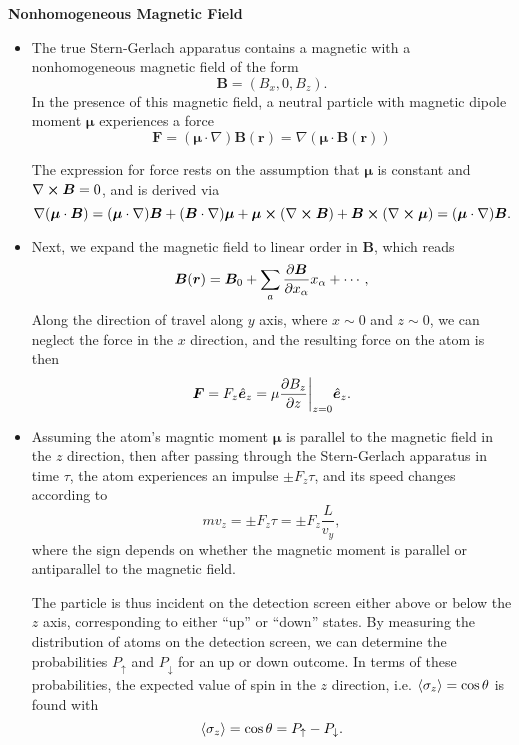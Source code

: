 \documentclass[11pt, a4paper]{article}
\renewcommand{\curl}{\nabla \cross}
\renewcommand{\grad}{\nabla}
\newcommand{\SG}{Stern-Gerlach\xspace}
\renewcommand{\vec}[1]{\bm{#1}}  %
\newcommand{\uvec}[1]{\hat{\vec{#1}}}  %
\newcommand{\ua}{\uparrow}  %
\newcommand{\da}{\downarrow}  %
\renewcommand{\r}{\vec{r}}  %
\newcommand{\B}{\vec{B}}  %
\newcommand{\m}{\vec{\mu}}  %
\begin{document}
\textbf{Nonhomogeneous Magnetic Field}
\begin{itemize}
    \item The true \SG apparatus contains a magnetic with a nonhomogeneous magnetic field of the form
    \begin{equation*}
        \B = (B_{x}, 0, B_{z}).
    \end{equation*}
    In the presence of this magnetic field, a neutral particle with magnetic dipole moment $ \m $ experiences a force
    \begin{equation*}
        \vec{F} = (\vec{\mu} \cdot \grad)\B(\r) = \grad (\m \cdot \B(\r))
    \end{equation*}
   

    The expression for force rests on the assumption that $ \m $ is constant and $ \curl \B = 0 $, and is derived via
    \begin{equation*}
        \grad (\m \cdot \B) = (\m \cdot \grad)\B + (\B \cdot \grad)\m + \m \cross (\curl \B) + \B \cross (\curl \m) = (\m \cdot \grad)\B.
    \end{equation*}
    
    \item Next, we expand the magnetic field to linear order in $ \B $, which reads
    \begin{equation*}
        \B(\r) = \B_{0} + \sum_{a} \pdv{\B}{x_{\alpha}}x_{\alpha} + \cdots,
    \end{equation*}
    Along the direction of travel along $ y $ axis, where $ x \sim 0 $ and $ z \sim 0 $, we can neglect the force in the $ x $ direction, and the resulting force on the atom is then
    \begin{equation*}
        \vec{F} = F_{z}\uvec{e}_{z} = \mu \pdv{B_{z}}{z}\bigg |_{z=0} \uvec{e}_{z}.
    \end{equation*}
    
    \item Assuming the atom's magntic moment $ \m $ is parallel to the magnetic field in the $ z $ direction, then after passing through the \SG apparatus in time $ \tau $, the atom experiences an impulse $ \pm F_{z} \tau $, and its speed changes according to
    \begin{equation*}
        m v_{z} = \pm F_{z} \tau = \pm F_{z} \frac{L}{v_{y}},
    \end{equation*}
    where the sign depends on whether the magnetic moment is parallel or antiparallel to the magnetic field.

    The particle is thus incident on the detection screen either above or below the $ z $ axis, corresponding to either ``up'' or ``down'' states. By measuring the distribution of atoms on the detection screen, we can determine the probabilities $ P_{\ua} $ and $ P_{\da} $ for an up or down outcome. In terms of these probabilities, the expected value of spin in the $ z $ direction, i.e. $ \ev{\sigma_{z}} = \cos \theta $ is found with
    \begin{equation*}
        \ev{\sigma_{z}} = \cos \theta = P_{\ua} - P_{\da}.
    \end{equation*}
    

\end{itemize}
\end{document}
